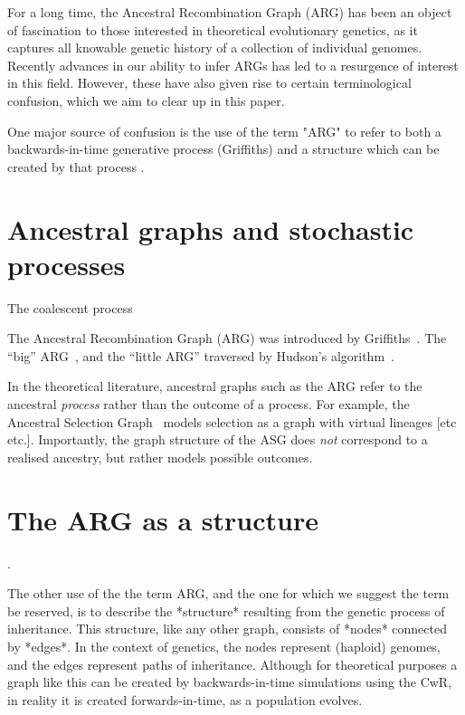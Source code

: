 \documentclass{article}
\begin{document}
For a long time, the Ancestral Recombination Graph (ARG) has been an object of fascination
to those interested in theoretical evolutionary genetics, as it captures all knowable genetic
history of a collection of individual genomes. Recently advances in our ability to infer ARGs
has led to a resurgence of interest in this field. However, these have also given rise to certain
terminological confusion, which we aim to clear up in this paper.

One major source of confusion is the use of the term "ARG" to refer to both a backwards-in-time
generative process (Griffiths) and a structure which can be created by that process \citep[e.g.][]{minichiello2006mapping,mathieson2020ancestry}.

\section*{Ancestral graphs and stochastic processes}
The coalescent
process~\citep{kingman1982coalescent,kingman1982genealogy,hudson1983testing,
tajima1983evolutionary}

The Ancestral Recombination Graph (ARG) was introduced by
Griffiths~\citep{griffiths1991two,griffiths1997ancestral}.
The ``big'' ARG~\citep{ethier1990two},
and the ``little ARG'' traversed by
Hudson's algorithm~\citep{hudson1983properties}.


In the theoretical literature, ancestral graphs such as the ARG refer to the
ancestral \emph{process} rather than the outcome of a process.
For example, the Ancestral Selection
Graph~\citep{krone1997ancestral,neuhauser1999ancestral} models selection
as a graph with virtual lineages [etc etc.]. Importantly, the graph structure
of the ASG does \emph{not} correspond to a realised ancestry, but rather
models possible outcomes.


\section*{The ARG as a structure}

\citep[e.g.][]{minichiello2006mapping,mathieson2020ancestry}.


The other use of the the term ARG, and the one for which we suggest the term be reserved,
is to describe the *structure* resulting from the genetic process of inheritance. This structure,
like any other graph, consists of *nodes* connected by *edges*. In the context of genetics, the
nodes represent (haploid) genomes, and the edges represent paths of inheritance. Although for
theoretical purposes a graph like this can be created by backwards-in-time simulations using
the CwR, in reality it is created forwards-in-time, as a population evolves.
\end{document}
